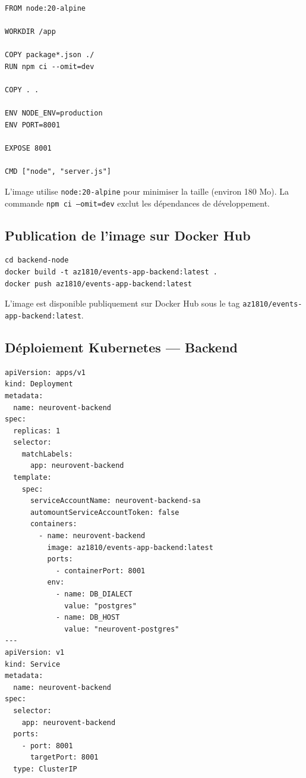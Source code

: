 \documentclass[12pt,a4paper]{article}
\begin{document}
\begin{lstlisting}[style=terminal, caption={backend-node/Dockerfile}]
FROM node:20-alpine

WORKDIR /app

COPY package*.json ./
RUN npm ci --omit=dev

COPY . .

ENV NODE_ENV=production
ENV PORT=8001

EXPOSE 8001

CMD ["node", "server.js"]
\end{lstlisting}

L'image utilise \texttt{node:20-alpine} pour minimiser la taille (environ 180 Mo).
La commande \texttt{npm ci --omit=dev} exclut les dépendances de développement.

\subsection{Publication de l'image sur Docker Hub}

\begin{lstlisting}[style=terminal, caption={Build et push de l'image backend}]
cd backend-node
docker build -t az1810/events-app-backend:latest .
docker push az1810/events-app-backend:latest
\end{lstlisting}

L'image est disponible publiquement sur Docker Hub sous le tag
\texttt{az1810/events-app-backend:latest}.

\subsection{Déploiement Kubernetes — Backend}

\begin{lstlisting}[style=yaml, caption={k8s/backend-deployment.yaml (extrait)}]
apiVersion: apps/v1
kind: Deployment
metadata:
  name: neurovent-backend
spec:
  replicas: 1
  selector:
    matchLabels:
      app: neurovent-backend
  template:
    spec:
      serviceAccountName: neurovent-backend-sa
      automountServiceAccountToken: false
      containers:
        - name: neurovent-backend
          image: az1810/events-app-backend:latest
          ports:
            - containerPort: 8001
          env:
            - name: DB_DIALECT
              value: "postgres"
            - name: DB_HOST
              value: "neurovent-postgres"
---
apiVersion: v1
kind: Service
metadata:
  name: neurovent-backend
spec:
  selector:
    app: neurovent-backend
  ports:
    - port: 8001
      targetPort: 8001
  type: ClusterIP
\end{lstlisting}
\end{document}
